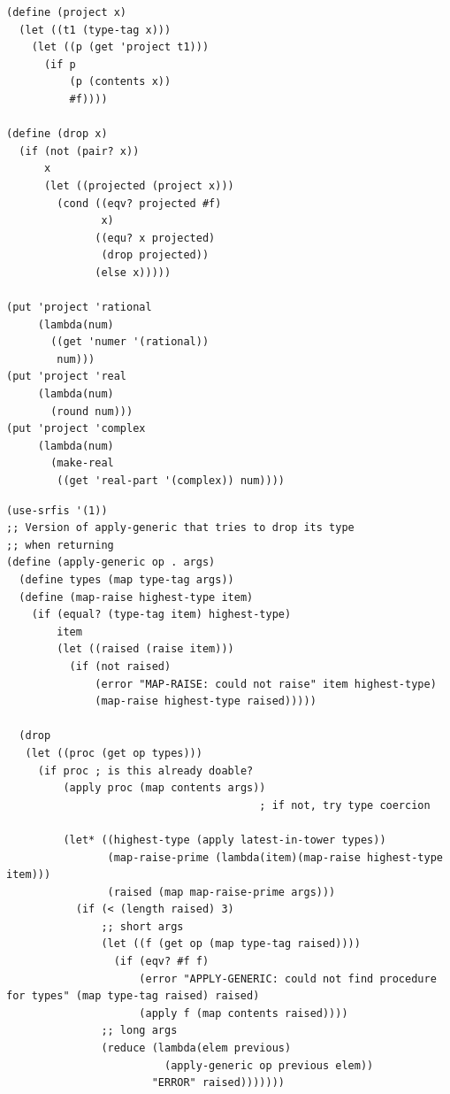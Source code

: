 \documentclass[final,fleqn,titlepage,twoside]{article}
\begin{document}
\begin{verbatim}
(define (project x)
  (let ((t1 (type-tag x)))
    (let ((p (get 'project t1)))
      (if p
          (p (contents x))
          #f))))

(define (drop x)
  (if (not (pair? x))
      x
      (let ((projected (project x)))
        (cond ((eqv? projected #f)
               x)
              ((equ? x projected)
               (drop projected))
              (else x)))))

(put 'project 'rational
     (lambda(num)
       ((get 'numer '(rational))
        num)))
(put 'project 'real
     (lambda(num)
       (round num)))
(put 'project 'complex
     (lambda(num)
       (make-real
        ((get 'real-part '(complex)) num))))
\end{verbatim}

\begin{verbatim}
(use-srfis '(1))
;; Version of apply-generic that tries to drop its type
;; when returning
(define (apply-generic op . args)
  (define types (map type-tag args))
  (define (map-raise highest-type item)
    (if (equal? (type-tag item) highest-type)
        item
        (let ((raised (raise item)))
          (if (not raised)
              (error "MAP-RAISE: could not raise" item highest-type)
              (map-raise highest-type raised)))))
  
  (drop
   (let ((proc (get op types)))
     (if proc ; is this already doable?
         (apply proc (map contents args))
                                        ; if not, try type coercion
         
         (let* ((highest-type (apply latest-in-tower types))
                (map-raise-prime (lambda(item)(map-raise highest-type item)))
                (raised (map map-raise-prime args)))
           (if (< (length raised) 3)
               ;; short args
               (let ((f (get op (map type-tag raised))))
                 (if (eqv? #f f)
                     (error "APPLY-GENERIC: could not find procedure for types" (map type-tag raised) raised)
                     (apply f (map contents raised))))
               ;; long args
               (reduce (lambda(elem previous)
                         (apply-generic op previous elem))
                       "ERROR" raised)))))))
\end{verbatim}
\end{document}
